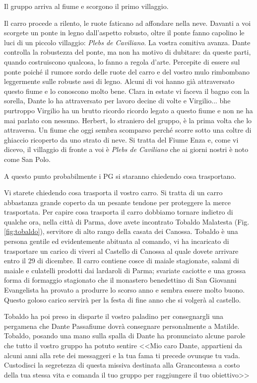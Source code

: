 \documentclass[letterpaper,twocolumn,openany,nodeprecatedcode]{dndbook}
\begin{document}
Il gruppo arriva al fiume e scorgono il primo villaggio.

\begin{DndReadAloud}
Il carro procede a rilento, le ruote faticano ad affondare nella neve. Davanti a voi scorgete un ponte in legno dall'aspetto robusto, oltre il ponte fanno capolino le luci di un piccolo villaggio: \textit{Plebs de Caviliano}. La vostra comitiva avanza. Dante controlla la robustezza del ponte, ma non ha motivo di dubitare: da queste parti, quando costruiscono qualcosa, lo fanno a regola d'arte. Percepite di essere sul ponte poiché il rumore sordo delle ruote del carro e del vostro mulo rimbombano leggermente sulle robuste assi di legno. Alcuni di voi hanno già attraversato questo fiume e lo conoscono molto bene. Clara in estate vi faceva il bagno con la sorella, Dante lo ha attraversato per lavoro decine di volte e Virgilio... bhe purtroppo Virgilio ha un brutto ricordo ricordo legato a questo fiume e non ne ha mai parlato con nessuno. Herbert, lo straniero del gruppo, è la prima volta che lo attraversa. Un fiume che oggi sembra scomparso perché scorre sotto una coltre di ghiaccio ricoperto da uno strato di neve. Si tratta del Fiume Enza e, come vi dicevo, il villaggio di fronte a voi è  \textit{Plebs de Caviliano} che ai giorni nostri è noto come San Polo.
\end{DndReadAloud}

A questo punto probabilmente i PG si staranno chiedendo cosa trasportano.

\begin{DndReadAloud}
Vi starete chiedendo cosa trasporta il vostro carro. Si tratta di un carro abbastanza grande coperto da un pesante tendone per proteggere la merce trasportata. Per capire cosa trasporta il carro dobbiamo tornare indietro di qualche ora, nella città di Parma, dove avete incontrato Tobaldo Malatesta (Fig.\ref{fig:tobaldo}), servitore di alto rango della casata dei Canossa. Tobaldo è una persona gentile ed evidentemente abituata al comando, vi ha incaricato di trasportare un carico di viveri al Castello di Canossa al quale dovete arrivare entro il 29 di dicembre. Il carro contiene cosce di maiale stagionate, salami di maiale e culatelli prodotti dai lardaroli di Parma; svariate caciotte e una grossa forma di formaggio stagionato che il monastero benedettino di San Giovanni Evangelista ha provato a produrre lo scorso anno e sembra essere molto buono. Questo goloso carico servirà per la festa di fine anno che si volgerà al castello.

Tobaldo ha poi preso in disparte il vostro paladino per consegnargli una pergamena che Dante Passafiume dovrà consegnare personalmente a Matilde. Tobaldo, posando una mano sulla spalla di Dante ha pronunciato alcune parole che tutto il vostro gruppo ha potuto sentire <<Mio caro Dante, appartieni da alcuni anni alla rete dei messaggeri e la tua fama ti precede ovunque tu vada. Custodisci la segretezza di questa missiva destinata alla Grancontessa a costo della tua stessa vita e comanda il tuo gruppo per raggiungere il tuo obiettivo>>
\end{DndReadAloud}
\end{document}
